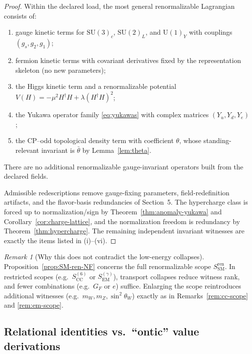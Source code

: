 \documentclass[11pt]{article}
\theoremstyle{remark}
\newtheorem{remark}[definition]{Remark}
\newcommand{\SM}{\ensuremath{\mathrm{SM}}}
\newcommand{\CC}{\ensuremath{\mathrm{CC}}}
\newcommand{\EM}{\ensuremath{\mathrm{EM}}}
\newcommand{\SU}{\ensuremath{\mathrm{SU}}}
\newcommand{\U}{\ensuremath{\mathrm{U}}}
\begin{document}
\begin{proof}
Within the declared load, the most general renormalizable Lagrangian consists of:
\begin{enumerate}[label=(\alph*),leftmargin=2.2em]
\item gauge kinetic terms for $\SU(3)_c$, $\SU(2)_L$, and $\U(1)_Y$ with couplings $(g_s,g_2,g_1)$;
\item fermion kinetic terms with covariant derivatives fixed by the representation skeleton (no new parameters);
\item the Higgs kinetic term and a renormalizable potential $V(H)=-\mu^2 H^\dagger H+\lambda(H^\dagger H)^2$;
\item the Yukawa operator family \eqref{eq:yukawas} with complex matrices $(Y_u,Y_d,Y_e)$;
\item the CP--odd topological density term with coefficient $\theta$, whose standing-relevant invariant is
$\bar\theta$ by Lemma~\ref{lem:theta}.
\end{enumerate}
There are no additional renormalizable gauge-invariant operators built from the declared fields.

Admissible redescriptions remove gauge-fixing parameters, field-redefinition artifacts, and the flavor-basis
redundancies of Section~5. The hypercharge class is forced up to normalization/sign by
Theorem~\ref{thm:anomaly-yukawa} and Corollary~\ref{cor:charge-lattice}, and the normalization freedom is
redundancy by Theorem~\ref{thm:hypercharge}. The remaining independent invariant witnesses are exactly the items
listed in (i)--(vi).
\end{proof}

\begin{remark}[Why this does not contradict the low-energy collapses]\label{rem:global-vs-restricted}
Proposition~\ref{prop:SM-ren-NF} concerns the full renormalizable scope $S_{\SM}^{\mathrm{ren}}$.
In restricted scopes (e.g.\ $S_{\CC}^{(6)}$ or $S_{\EM}^{(\gamma)}$), transport collapses reduce witness rank,
and fewer combinations (e.g.\ $G_F$ or $e$) suffice. Enlarging the scope reintroduces additional witnesses
(e.g.\ $m_W,m_Z,\sin^2\theta_W$) exactly as in Remarks~\ref{rem:cc-scope} and \ref{rem:em-scope}.
\end{remark}

\subsection{Relational identities vs.\ ``ontic'' value derivations}
\end{document}
